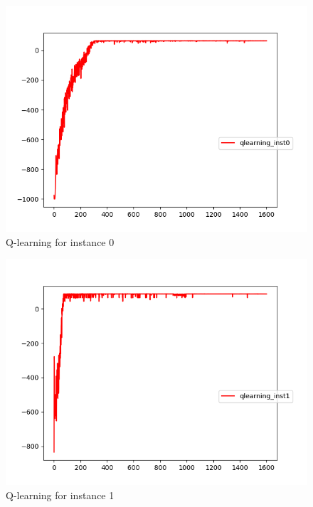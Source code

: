 \documentclass{article}
\begin{document}
\begin{figure}[H]
  \centering
  \includegraphics[scale=0.5]{images/qlearn_instance_0}
  \caption{Q-learning for instance 0}
  \label{fig:ql0}
\end{figure}

\begin{figure}[H]
  \centering
  \includegraphics[scale=0.5]{images/qlearn_instance_1}
  \caption{Q-learning for instance 1}
  \label{fig:ql1}
\end{figure}
\end{document}
